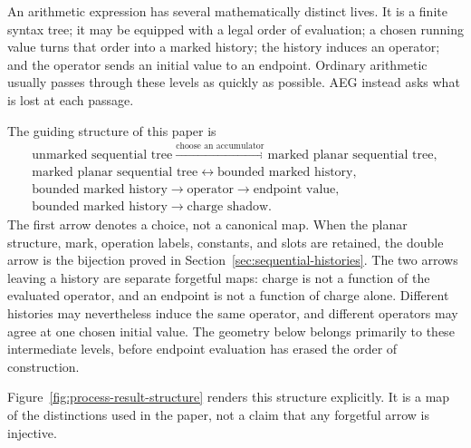 An arithmetic expression has several mathematically distinct lives.  It is a finite
syntax tree; it may be equipped with a legal order of evaluation; a chosen running
value turns that order into a marked history; the history induces an operator; and
the operator sends an initial value to an endpoint.  Ordinary arithmetic usually
passes through these levels as quickly as possible.  AEG instead asks what is lost
at each passage.

The guiding structure of this paper is
\begin{equation}\label{eq:process-result-hierarchy}
\begin{gathered}
\text{unmarked sequential tree}
  \xrightarrow{\text{choose an accumulator}}
\text{marked planar sequential tree},\\
\text{marked planar sequential tree}
  \longleftrightarrow
\text{bounded marked history},\\
\text{bounded marked history}
  \longrightarrow \text{operator}
  \longrightarrow \text{endpoint value},\\
\text{bounded marked history}
  \longrightarrow \text{charge shadow}.
\end{gathered}
\end{equation}
The first arrow denotes a choice, not a canonical map.  When the planar structure,
mark, operation labels, constants, and slots are retained, the double arrow is the
bijection proved in Section~\ref{sec:sequential-histories}.  The two arrows leaving a
history are separate forgetful maps: charge is not a function of the evaluated
operator, and an endpoint is not a function of charge alone.  Different histories
may nevertheless induce the same operator, and different operators may agree at one
chosen initial value.  The geometry below belongs primarily to these intermediate
levels, before endpoint evaluation has erased the order of construction.

Figure~\ref{fig:process-result-structure} renders this structure explicitly.
It is a map of the distinctions used in the paper, not a claim that any
forgetful arrow is injective.

